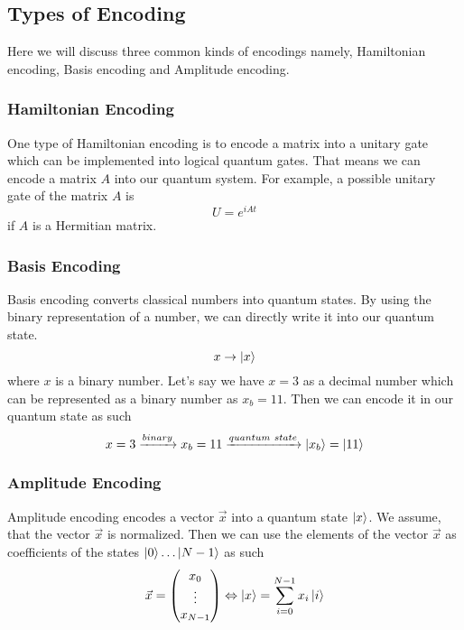 \subsection{Types of Encoding}
Here we will discuss three common kinds of encodings namely, Hamiltonian encoding, Basis encoding and Amplitude encoding.

\subsubsection{Hamiltonian Encoding}
One type of Hamiltonian encoding is to encode a matrix into a unitary gate which can be implemented into logical quantum gates. 
That means we can encode a matrix $A$ into our quantum system.
For example, a possible unitary gate of the matrix $A$ is
\begin{equation}
    U = e^{iAt}
\end{equation}
if $A$ is a Hermitian matrix.

\subsubsection{Basis Encoding}
Basis encoding converts classical numbers into quantum states.
By using the binary representation of a number, we can directly write it into our quantum state. 
\begin{equation}
    x \rightarrow \ket {x}
\end{equation}
where $x$ is a binary number.
Let's say we have $x=3$ as a decimal number which can be represented as a binary number as $x_b = 11$.
Then we can encode it in our quantum state as such
\begin{equation}
    x=3 \xrightarrow[]{binary} x_b = 11 \xrightarrow[]{quantum\  state} \ket{x_b} = \ket{11}
\end{equation}

\subsubsection{Amplitude Encoding}
Amplitude encoding encodes a vector $\vec x$ into a quantum state $\ket x$. 
We assume, that the vector $\vec x$ is normalized. 
Then we can use the elements of the vector $\vec x$ as coefficients of the states $\ket 0 \dots \ket {N-1}$ as such
\begin{equation}
    \vec{x} = \begin{pmatrix} x_0\\ \vdots \\ x_{N-1} \end{pmatrix} 
    \Leftrightarrow  
     \ket x = \sum_{i=0}^{N-1} x_i \ket i
\end{equation}

